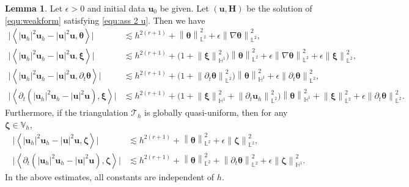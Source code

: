 \documentclass[11pt, reqno]{amsart}
\theoremstyle{definition}
\newtheorem{lemma}[theorem]{Lemma}
\theoremstyle{remark}
\numberwithin{equation}{section}
\newcommand{\bff}{\boldsymbol}
\newcommand{\bb}{\mathbb}
\newcommand{\norm}[2]{\left\|{#1}\right\|_{#2}}
\newcommand{\inpro}[2]{\left\langle#1,#2\right\rangle}
\begin{document}
\begin{lemma}\label{lem:nonlinear est}
Let $\epsilon>0$ and initial data $\bff{u}_0$ be given. Let $(\bff{u},\bff{H})$ be the solution of \eqref{equ:weakform} satisfying \eqref{equ:ass 2 u}. Then we have
	\begin{align}
		\label{equ:uh2uh theta}
		\big| \inpro{|\bff{u}_h|^2 \bff{u}_h - |\bff{u}|^2 \bff{u}}{\bff{\theta}} \big|
		&\lesssim
		h^{2(r+1)}
		+
		\norm{\bff{\theta}}{\bb{L}^2}^2 
		+ 
		\epsilon \norm{\nabla \bff{\theta}}{\bb{L}^2}^2,
		\\
		\label{equ:uh2uh xi}
		\big| \inpro{|\bff{u}_h|^2 \bff{u}_h - |\bff{u}|^2 \bff{u}}{\bff{\xi}} \big|
		&\lesssim
		h^{2(r+1)}
		+
		\big( 1+\norm{\bff{\xi}}{\bb{H}^1}^2 \big) \norm{\bff{\theta}}{\bb{L}^2}^2 
		+ 
		\epsilon \norm{\nabla \bff{\theta}}{\bb{L}^2}^2
		+ 
		\epsilon \norm{\bff{\xi}}{\bb{L}^2}^2,
		\\
		\label{equ:uh2uh dt theta}
		\big| \inpro{|\bff{u}_h|^2 \bff{u}_h - |\bff{u}|^2 \bff{u}}{\partial_t \bff{\theta}} \big|
		&\lesssim
		h^{2(r+1)}
		+
		\big( 1+\norm{\partial_t \bff{\theta}}{\bb{L}^2}^2 \big) \norm{\bff{\theta}}{\bb{H}^1}^2  
		+ 
		\epsilon \norm{\partial_t \bff{\theta}}{\bb{L}^2}^2,
		\\
		\label{equ:dt uh2uh xi}
		\big| \inpro{\partial_t(|\bff{u}_h|^2 \bff{u}_h - |\bff{u}|^2 \bff{u})}{\bff{\xi}} \big|
		&\lesssim
		h^{2(r+1)}
		+
		\big( 1 + \norm{\bff{\xi}}{\bb{H}^1}^2 + \norm{\partial_t \bff{u}_h}{\bb{L}^2}^2 \big) \norm{\bff{\theta}}{\bb{H}^1}^2 
		+ 
		\norm{\bff{\xi}}{\bb{L}^2}^2
		+
		\epsilon \norm{\partial_t \bff{\theta}}{\bb{L}^2}^2.
	\end{align}
Furthermore, if the triangulation $\mathcal{T}_h$ is globally quasi-uniform, then for any $\bff{\zeta}\in \bb{V}_h$,
	\begin{align}
		\label{equ:uh2uh Delta theta}
		\big| \inpro{|\bff{u}_h|^2 \bff{u}_h - |\bff{u}|^2 \bff{u}}{\bff{\zeta}} \big|
		&\lesssim
		h^{2(r+1)}
		+
		\norm{\bff{\theta}}{\bb{L}^2}^2 
		+ 
		\epsilon \norm{\bff{\zeta}}{\bb{L}^2}^2,
		\\
		\label{equ:dt uh2uh}
		\big| \inpro{\partial_t \left(|\bff{u}_h|^2 \bff{u}_h - |\bff{u}|^2 \bff{u}\right)}{\bff{\zeta}} \big|
		&\lesssim
		h^{2(r+1)} + \norm{\bff{\theta}}{\bb{L}^2}^2
		+ \norm{\partial_t \bff{\theta}}{\bb{L}^2}^2
		+
		\epsilon \norm{\bff{\zeta}}{\bb{H}^1}^2.
	\end{align}
In the above estimates, all constants are independent of $h$.
\end{lemma}
\end{document}
